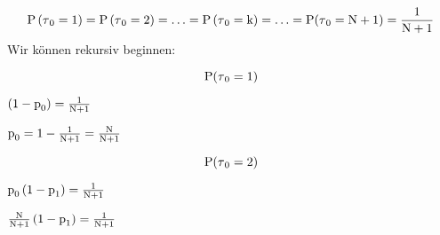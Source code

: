 {\begin{uebsp}
\begin{Answer}
\begin{equation*}
\normalsubformula{\text{P}}\left(\normalsubformula{\text{$\tau
$}}_{\normalsubformula{\text{0}}}=\normalsubformula{\text{1}}\right)=\normalsubformula{\text{P}}\left(\normalsubformula{\text{$\tau
$}}_{\normalsubformula{\text{0}}}=\normalsubformula{\text{2}}\right)=\ldots
=\normalsubformula{\text{P}}\left(\normalsubformula{\text{$\tau
$}}_{\normalsubformula{\text{0}}}=\normalsubformula{\text{k}}\right)=\ldots
=\normalsubformula{\text{P}}(\normalsubformula{\text{$\tau
$}}_{\normalsubformula{\text{0}}}=\normalsubformula{\text{N}}+\normalsubformula{\text{1}})=\frac{\normalsubformula{\text{1}}}{\normalsubformula{\text{N}}+\normalsubformula{\text{1}}}
\end{equation*}
{
Wir k\"onnen rekursiv beginnen:}

\begin{equation*}
\normalsubformula{\text{P}}(\normalsubformula{\text{$\tau
$}}_{\normalsubformula{\text{0}}}=\normalsubformula{\text{1}})
\end{equation*}
{\centering 
$\left(\normalsubformula{\text{1}}-\normalsubformula{\text{p}}_{\normalsubformula{\text{0}}}\right)=\frac{\normalsubformula{\text{1}}}{\normalsubformula{\text{N}}+\normalsubformula{\text{1}}}$\newline

$\normalsubformula{\text{p}}_{\normalsubformula{\text{0}}}=\normalsubformula{\text{1}}-\frac{\normalsubformula{\text{1}}}{\normalsubformula{\text{N}}+\normalsubformula{\text{1}}}=\frac{\normalsubformula{\text{N}}}{\normalsubformula{\text{N}}+\normalsubformula{\text{1}}}$\par}

\begin{equation*}
\normalsubformula{\text{P}}(\normalsubformula{\text{$\tau
$}}_{\normalsubformula{\text{0}}}=\normalsubformula{\text{2}})
\end{equation*}
{\centering 
$\normalsubformula{\text{p}}_{\normalsubformula{\text{0}}}\left(\normalsubformula{\text{1}}-\normalsubformula{\text{p}}_{\normalsubformula{\text{1}}}\right)=\frac{\normalsubformula{\text{1}}}{\normalsubformula{\text{N}}+\normalsubformula{\text{1}}}$\newline

$\frac{\normalsubformula{\text{N}}}{\normalsubformula{\text{N}}+\normalsubformula{\text{1}}}\left(\normalsubformula{\text{1}}-\normalsubformula{\text{p}}_{\normalsubformula{\text{1}}}\right)=\frac{\normalsubformula{\text{1}}}{\normalsubformula{\text{N}}+\normalsubformula{\text{1}}}$\newline

}
\end{Answer}
\end{uebsp}}
